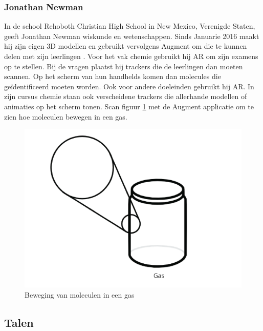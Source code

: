 \documentclass[pdftex,a4paper,12pt,twoside]{report}
\begin{document}
\subsubsection{Jonathan Newman}
In de school Rehoboth Christian High School in New Mexico, Verenigde Staten, geeft Jonathan Newman wiskunde en wetenschappen. Sinds Januarie 2016 maakt hij zijn eigen 3D modellen en gebruikt vervolgens Augment om die te kunnen delen met zijn leerlingen \citep{augmentchemie}. Voor het vak chemie gebruikt hij AR om zijn examens op te stellen. Bij de vragen plaatst hij trackers die de leerlingen dan moeten scannen. Op het scherm van hun handhelds komen dan molecules die ge\"identificeerd moeten worden. Ook voor andere doeleinden gebruikt hij AR. In zijn cursus chemie staan ook verscheidene trackers die allerhande modellen of animaties op het scherm tonen. Scan figuur \ref{fig:gas} met de Augment applicatie om te zien hoe moleculen bewegen in een gas.  
\begin{figure}[!htr]
\begin{center}
\includegraphics[scale=0.3]{gas}
\caption{Beweging van moleculen in een gas \citep{augmentchemie}} \label{fig:gas}
\end{center}
\end{figure}

\newpage
\subsection{Talen}
\end{document}
